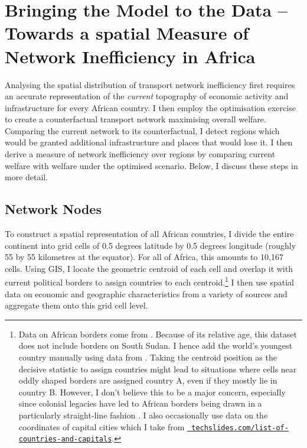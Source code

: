 \documentclass[11pt, oneside]{article}   	%
\begin{document}
\section{Bringing the Model to the Data -- Towards a spatial Measure of Network Inefficiency in Africa}
\label{chapter:calibration}
Analysing the spatial distribution of transport network inefficiency first requires an accurate representation of the \emph{current} topography of economic activity and infrastructure for every African country. I then employ the \cite{fajgelbaum_optimal_2017} optimisation exercise to create a counterfactual transport network maximising overall welfare. Comparing the current network to its counterfactual, I detect regions which would be granted additional infrastructure and places that would lose it. I then derive a measure of network inefficiency over regions by comparing current welfare with welfare under the optimised scenario. Below, I discuss these steps in more detail.

\subsection{Network Nodes}

To construct a spatial representation of all African countries, I divide the entire continent into grid cells of 0.5 degrees latitude by 0.5 degrees longitude (roughly 55 by 55 kilometres at the equator). For all of Africa, this amounts to 10,167 cells. Using GIS, I locate the geometric centroid of each cell and overlap it with current political borders to assign countries to each centroid.\footnote{Data on African borders come from \cite{Sandvik_WorldBordersDataset_2008}. Because of its relative age, this dataset does not include borders on South Sudan. I hence add the world's youngest country manually using data from \cite{OCHA_SouthSudanAdministrative_2017}. Taking the centroid position as the decisive statistic to assign countries might lead to situations where cells near oddly shaped borders are assigned country A, even if they mostly lie in country B. However, I don't believe this to be a major concern, especially since colonial legacies have led to African borders being drawn in a particularly straight-line fashion \citep[see][]{Alesina_ArtificialStates_2011}. I also occasionally use data on the coordinates of capital cities which I take from \href{http://techslides.com/list-of-countries-and-capitals}{\texttt{ techslides.com/list-of-countries-and-capitals}}.} I then use spatial data on economic and geographic characteristics from a variety of sources and aggregate them onto this grid cell level.
\end{document}
